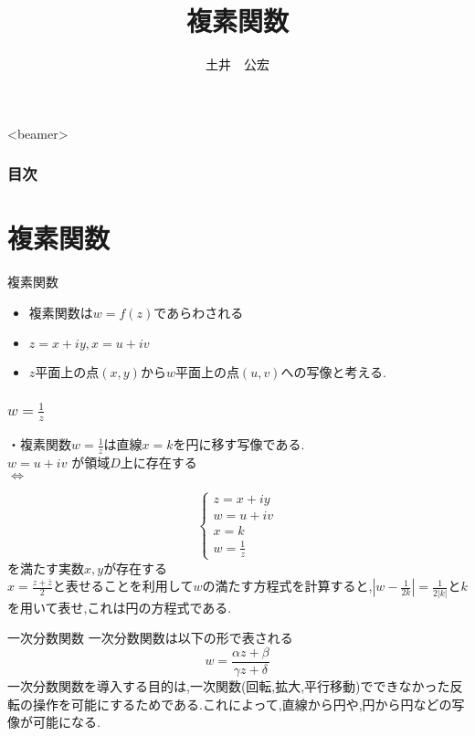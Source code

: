 \documentclass[t,dvipdfmx,10pt]{beamer}
\title[自主ゼミ]{複素関数}
\subtitle{}
\author[Kimihiro Doi]{土井　公宏}
\institute{}
\date[]{}
\begin{document}
\begin{frame}
 \titlepage 
\end{frame}

\begin{frame}<beamer>
  \frametitle{目次}
    \tableofcontents[] 
\end{frame}



\section{複素関数}
\begin{frame}{複素関数}
\begin{itemize}
    \item 複素関数は$w=f(z)$であらわされる
    \item $z=x+iy,x=u+iv$
    \item $z$平面上の点$(x,y)$から$w$平面上の点$(u,v)$への写像と考える.
\end{itemize}
    
\end{frame}
\begin{frame}
\frametitle{$w=\frac{1}{z}$}
・複素関数$w=\frac{1}{z}$は直線$x=k$を円に移す写像である.
\\

$w=u+iv$ が領域$D$上に存在する
\\
$ \Leftrightarrow $

\[
  \begin{cases}
    z=x+iy \\
    w=u+iv \\
    x=k \\
    w=\frac{1}{z}
  \end{cases}
\]
を満たす実数$x,y$が存在する
\\


$x=\frac{z+\overline{z}}{2}$と表せることを利用して$w$の満たす方程式を計算すると,$|w-\frac{1}{2k}|=\frac{1}{2|k|}$と$k$を用いて表せ,これは円の方程式である.
\end{frame}

\begin{frame}{一次分数関数}
一次分数関数は以下の形で表される
\begin{displaymath}
w=\frac{\alpha z+\beta}{\gamma z +\delta}
\end{displaymath}
一次分数関数を導入する目的は,一次関数(回転,拡大,平行移動)でできなかった反転の操作を可能にするためである.これによって,直線から円や,円から円などの写像が可能になる.
\end{frame}
\end{document}
